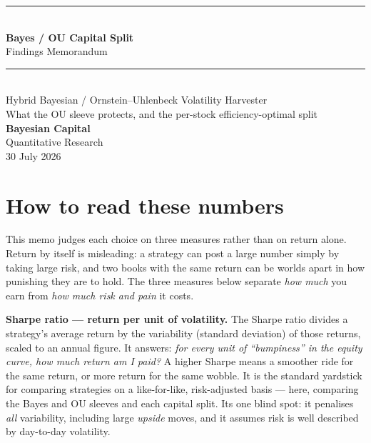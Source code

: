 \documentclass[11pt]{article}
\begin{document}
\begin{titlepage}
\vspace*{1.2cm}
{\color{bcgold}\rule{\textwidth}{2pt}}\\[0.4cm]
{\color{bcnavy}\Huge\bfseries Bayes / OU Capital Split}\\[0.35cm]
{\color{bcblue}\LARGE Findings Memorandum}\\[0.5cm]
{\color{bcgold}\rule{\textwidth}{1pt}}\\[0.6cm]
{\large\color{bcgrey} Hybrid Bayesian / Ornstein--Uhlenbeck Volatility Harvester}\\[0.2cm]
{\large\color{bcgrey} What the OU sleeve protects, and the per-stock efficiency-optimal split}\\[1.2cm]
{\color{bcnavy}\large\bfseries Bayesian Capital}\\[0.15cm]
{\color{bcgrey} Quantitative Research}\\[0.15cm]
{\color{bcgrey} 30 July 2026}\\[2cm]

\end{titlepage}

\section{How to read these numbers}

This memo judges each choice on three measures rather than on return alone. Return by itself
is misleading: a strategy can post a large number simply by taking large risk, and two books
with the same return can be worlds apart in how punishing they are to hold. The three
measures below separate \emph{how much} you earn from \emph{how much risk and pain} it costs.

\textbf{Sharpe ratio --- return per unit of volatility.} The Sharpe ratio divides a strategy's
average return by the variability (standard deviation) of those returns, scaled to an annual
figure. It answers: \emph{for every unit of ``bumpiness'' in the equity curve, how much return
am I paid?} A higher Sharpe means a smoother ride for the same return, or more return for the
same wobble. It is the standard yardstick for comparing strategies on a like-for-like,
risk-adjusted basis --- here, comparing the Bayes and OU sleeves and each capital split. Its
one blind spot: it penalises \emph{all} variability, including large \emph{upside} moves, and it
assumes risk is well described by day-to-day volatility.
\end{document}
